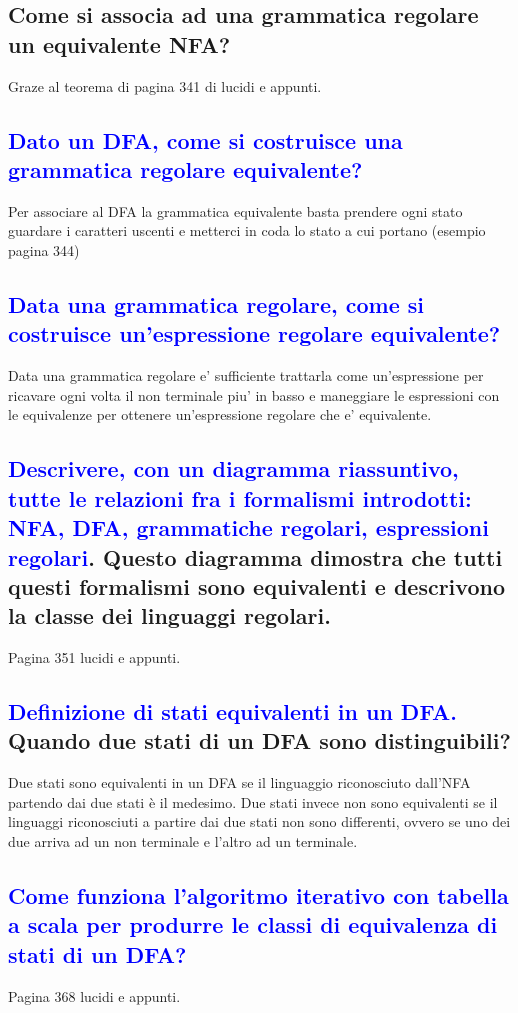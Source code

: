 \documentclass{article}
\begin{document}
\subsection{Come si associa ad una grammatica regolare un equivalente NFA?}
Graze al teorema di pagina 341 di lucidi e appunti.
\subsection{\textcolor{blue}{Dato un DFA, come si costruisce una grammatica regolare equivalente?}}
Per associare al DFA la grammatica equivalente basta prendere ogni stato guardare i caratteri uscenti e metterci in coda lo stato a cui portano (esempio pagina 344)
\subsection{\textcolor{blue}{Data una grammatica regolare, come si costruisce un'espressione regolare equivalente?}}
Data una grammatica regolare e' sufficiente trattarla come un'espressione per ricavare ogni volta il non terminale piu' in basso e maneggiare le espressioni con le equivalenze per ottenere un'espressione regolare che e' equivalente.
\subsection{\textcolor{blue}{Descrivere, con un diagramma riassuntivo, tutte le relazioni fra i formalismi introdotti: NFA, DFA, grammatiche regolari, espressioni regolari}.
    Questo diagramma dimostra che tutti questi formalismi sono equivalenti e descrivono la classe dei linguaggi regolari.}
Pagina 351 lucidi e appunti.
\subsection{\textcolor{blue}{Definizione di stati equivalenti in un DFA.} Quando due stati di un DFA sono distinguibili?}
Due stati sono equivalenti in un DFA se il linguaggio riconosciuto dall'NFA partendo dai due stati è il medesimo.
Due stati invece non sono equivalenti se il linguaggi riconosciuti a partire dai due stati non sono differenti, ovvero se uno dei due arriva ad un non terminale e l'altro ad un terminale.
\subsection{\textcolor{blue}{Come funziona l'algoritmo iterativo con tabella a scala per produrre le classi di equivalenza di stati di un DFA?}}
Pagina 368 lucidi e appunti.
\end{document}

